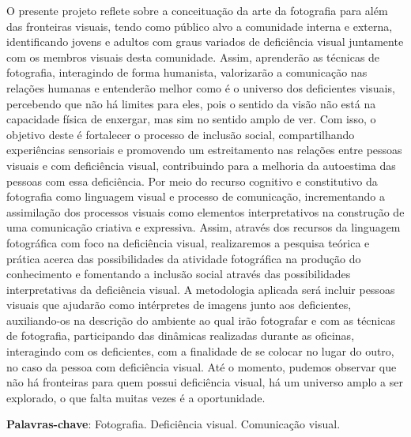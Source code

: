 \documentclass[article,12pt,onesidea,4paper,english,brazil]{abntex2}
\begin{document}
	\noindent O presente projeto reflete sobre a conceituação da arte da fotografia para além das fronteiras visuais, tendo como público alvo a comunidade interna e externa, identificando jovens e adultos com graus variados de deficiência visual juntamente com os membros visuais desta comunidade. Assim, aprenderão as técnicas de fotografia, interagindo de forma humanista, valorizarão a comunicação nas relações humanas e entenderão melhor como é o universo dos deficientes visuais, percebendo que não há limites para eles, pois o sentido da visão não está na capacidade física de enxergar, mas sim no sentido amplo de ver. Com isso, o objetivo deste é fortalecer o processo de inclusão social, compartilhando experiências sensoriais e promovendo um estreitamento nas relações entre pessoas visuais e com deficiência visual, contribuindo para a melhoria da autoestima das pessoas com essa deficiência. Por meio do recurso cognitivo e constitutivo da fotografia como linguagem visual e processo de comunicação, incrementando a assimilação dos processos visuais como elementos interpretativos na construção de uma comunicação criativa e expressiva. Assim, através dos recursos da linguagem fotográfica com foco na deficiência visual, realizaremos a pesquisa teórica e prática acerca das possibilidades da atividade fotográfica na produção do conhecimento e fomentando a inclusão social através das possibilidades interpretativas da deficiência visual.  A metodologia aplicada será incluir pessoas visuais que ajudarão como intérpretes de imagens junto aos deficientes, auxiliando-os na descrição do ambiente ao qual irão fotografar e com as técnicas de fotografia, participando das dinâmicas realizadas durante as oficinas, interagindo com os deficientes, com a finalidade de se colocar no lugar do outro, no caso da pessoa com deficiência visual.  Até o momento, pudemos observar que não há fronteiras para quem possui deficiência visual, há um universo amplo a ser explorado, o que falta muitas vezes é a oportunidade.
	
	\vspace{\onelineskip}
	
	\noindent
	\textbf{Palavras-chave}: Fotografia. Deficiência visual. Comunicação visual.
	
\end{document}
